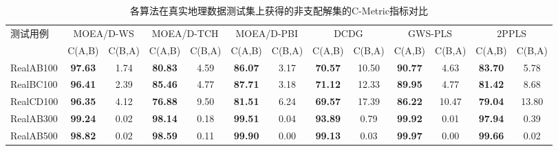 \begin{table}[h]
    \small
    \renewcommand\arraystretch{1.2}
    \renewcommand\tabcolsep{2pt}
    \centering
    \caption{各算法在真实地理数据测试集上获得的非支配解集的C-Metric指标对比 \label{tab:各算法在真实地理数据测试集上获得的非支配解集的C-Metric指标对比}}
    \begin{threeparttable}
        \begin{tabular}{lcccccccccccc}
            \toprule
            \multirow{2}[4]{*}{测试用例} & \multicolumn{2}{c}{MOEA/D-WS} & \multicolumn{2}{c}{MOEA/D-TCH} & \multicolumn{2}{c}{MOEA/D-PBI} & \multicolumn{2}{c}{DCDG} & \multicolumn{2}{c}{GWS-PLS} & \multicolumn{2}{c}{2PPLS} \\
            \cmidrule{2-13}    & C(A,B)         & C(B,A)       & C(A,B)           & C(B,A)          & C(A,B)          & C(B,A)         & C(A,B)          & C(B,A)        & C(A,B)          & C(B,A) & C(A,B)          & C(B,A) \\
            \midrule
            RealAB100                     & \textbf{97.63}                & 1.74                           & \textbf{80.83}                 & 4.59                     & \textbf{86.07}              & 3.17                      & \textbf{70.57}           & 10.50  & \textbf{90.77}  & 4.63   & \textbf{83.70}  & 5.78  \\
            RealBC100                     & \textbf{96.41}                & 2.39                           & \textbf{85.46}                 & 4.77                     & \textbf{87.71}              & 3.18                      & \textbf{71.12}           & 12.33  & \textbf{89.95}  & 4.77   & \textbf{81.42}  & 8.68  \\
            RealCD100                     & \textbf{96.35}                & 4.12                           & \textbf{76.88}                 & 9.50                     & \textbf{81.51}              & 6.24                      & \textbf{69.57}           & 17.39  & \textbf{86.22}  & 10.47  & \textbf{79.04}  & 13.80  \\
            RealAB300                     & \textbf{99.24}                & 0.02                           & \textbf{98.14}                 & 0.18                     & \textbf{99.51}              & 0.04                      & \textbf{93.89}           & 0.79   & \textbf{99.92}  & 0.01   & \textbf{97.94}  & 0.39  \\
            RealAB500                     & \textbf{98.82}                & 0.02                           & \textbf{98.59}                 & 0.11                     & \textbf{99.90}              & 0.00                      & \textbf{99.13}           & 0.03   & \textbf{99.97}  & 0.00   & \textbf{99.66}  & 0.02  \\

\end{tabular}
\end{threeparttable}
\end{table}
